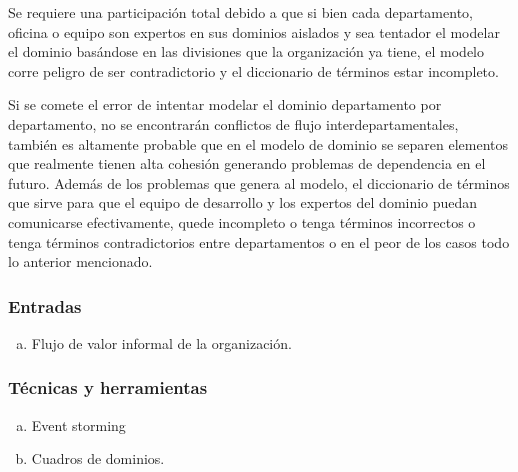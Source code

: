 Se requiere una participación total debido a que si bien cada departamento, oficina o equipo son expertos
en sus dominios aislados y sea tentador el modelar el dominio basándose en las divisiones que la organización ya
tiene, el modelo corre peligro de ser contradictorio y el diccionario de términos estar incompleto.

Si se comete el error de intentar modelar el dominio departamento por departamento, no se encontrarán
conflictos de flujo interdepartamentales, también es altamente probable que en el modelo de dominio
se separen elementos que realmente tienen alta cohesión generando problemas de dependencia en el futuro.
Además de los problemas que genera al modelo, el diccionario de términos que sirve para que el equipo
de desarrollo y los expertos del dominio puedan comunicarse efectivamente, quede incompleto o tenga
términos incorrectos o tenga términos contradictorios entre departamentos o en el peor de los casos
todo lo anterior mencionado.

\subsubsection*{Entradas}
\begin{enumerate}[a.]
	\item Flujo de valor informal de la organización.
\end{enumerate}

\subsubsection*{Técnicas y herramientas}
\begin{enumerate}[a.]
  \item Event storming
	\item Cuadros de dominios.
\end{enumerate}

\vspace{1em}

